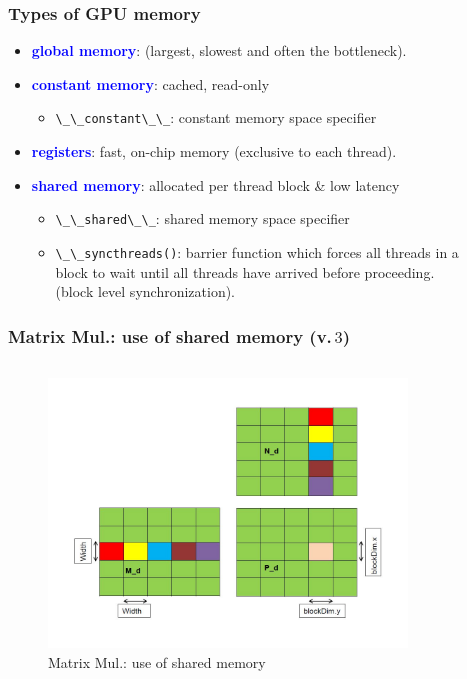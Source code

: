 \begin{frame}
\frametitle{Types of GPU memory}
\begin{itemize}
   \item \textbf{\textcolor{blue}{global memory}}: (largest, slowest and often the bottleneck).
   \item \textbf{\textcolor{blue}{constant memory}}: cached, read-only
      \begin{itemize}	   
	 \item  \lstinline[style=MyCudaStyle]|\_\_constant\_\_|: constant memory space specifier
      \end{itemize}		      
   \item \textbf{\textcolor{blue}{registers}}: fast, on-chip memory (exclusive to each thread).
   \item \textbf{\textcolor{blue}{shared memory}}: allocated per thread block \& low latency
   \begin{itemize}
      \item \lstinline[style=MyCudaStyle]|\_\_shared\_\_|: shared memory space specifier		   
      \item \lstinline[style=MyCudaStyle]|\_\_syncthreads()|: barrier function which forces 
	      all threads in a \\block to wait until all threads have arrived before proceeding.\\
              (block level synchronization).	
   \end{itemize}		   
\end{itemize}
\end{frame}


\begin{frame}
   \frametitle{Matrix Mul.: use of shared memory (v.\,$3$)}
      \begin{columns}
           \begin{figure}[H]
              \centering
              \includegraphics[width=0.85\textwidth]{./img/mulC.jpg}
                   \caption{\small{Matrix Mul.: use of shared memory}}
           \end{figure}
     \end{columns}
\end{frame}

